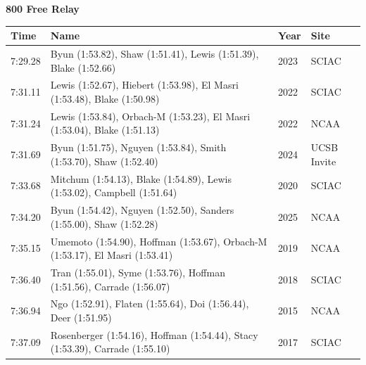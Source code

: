 \noindent\begin{minipage}[t]{0.98\textwidth}
\centering
\textbf{\textcolor{teamprimary}{800 Free Relay}}\par
\vspace{0.5em}
\centering
\small
\renewcommand{\arraystretch}{1.0}
\setlength{\tabcolsep}{4pt}
\begin{tabular}{@{}p{2.7cm}p{4.3cm}p{1.6cm}p{2.7cm}@{}}
\toprule
\textbf{Time} & \textbf{Name} & \textbf{Year} & \textbf{Site} \\
\midrule
7:29.28 & Byun (1:53.82), Shaw (1:51.41), Lewis (1:51.39), Blake (1:52.66) & 2023 & SCIAC \\
7:31.11 & Lewis (1:52.67), Hiebert (1:53.98), El Masri (1:53.48), Blake (1:50.98) & 2022 & SCIAC \\
7:31.24 & Lewis (1:53.84), Orbach-M (1:53.23), El Masri (1:53.04), Blake (1:51.13) & 2022 & NCAA \\
7:31.69 & Byun (1:51.75), Nguyen (1:53.84), Smith (1:53.70), Shaw (1:52.40) & 2024 & UCSB Invite \\
7:33.68 & Mitchum (1:54.13), Blake (1:54.89), Lewis (1:53.02), Campbell (1:51.64) & 2020 & SCIAC \\
7:34.20 & Byun (1:54.42), Nguyen (1:52.50), Sanders (1:55.00), Shaw (1:52.28) & 2025 & NCAA \\
7:35.15 & Umemoto (1:54.90), Hoffman (1:53.67), Orbach-M (1:53.17), El Masri (1:53.41) & 2019 & NCAA \\
7:36.40 & Tran (1:55.01), Syme (1:53.76), Hoffman (1:51.56), Carrade (1:56.07) & 2018 & SCIAC \\
7:36.94 & Ngo (1:52.91), Flaten (1:55.64), Doi (1:56.44), Deer (1:51.95) & 2015 & NCAA \\
7:37.09 & Rosenberger (1:54.16), Hoffman (1:54.44), Stacy (1:53.39), Carrade (1:55.10) & 2017 & SCIAC \\
\bottomrule
\end{tabular}
\end{minipage}
\vspace{1.2em}
